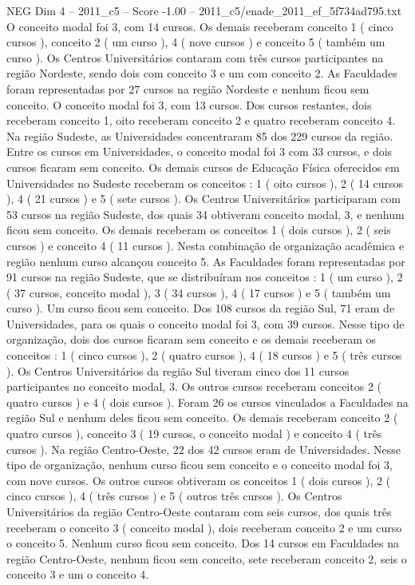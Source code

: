 \begin{textsample}{NEG Dim 4 – 2011\_c5 – Score -1.00 – 2011\_c5/enade\_2011\_ef\_5f734ad795.txt}
O conceito modal foi 3, com 14 cursos.
Os demais receberam conceito 1 ( cinco cursos ), conceito 2 ( um curso ), 4 ( nove cursos ) e conceito 5 ( também um curso ).
Os Centros Universitários contaram com três cursos participantes na região Nordeste, sendo dois com conceito 3 e um com conceito 2.
As Faculdades foram representadas por 27 cursos na região Nordeste e nenhum ficou sem conceito.
O conceito modal foi 3, com 13 cursos.
Dos cursos restantes, dois receberam conceito 1, oito receberam conceito 2 e quatro receberam conceito 4.
Na região Sudeste, as Universidades concentraram 85 dos 229 cursos da região.
Entre os cursos em Universidades, o conceito modal foi 3 com 33 cursos, e dois cursos ficaram sem conceito.
Os demais cursos de Educação Física oferecidos em Universidades no Sudeste receberam os conceitos : 1 ( oito cursos ), 2 ( 14 cursos ), 4 ( 21 cursos ) e 5 ( sete cursos ).
Os Centros Universitários participaram com 53 cursos na região Sudeste, dos quais 34 obtiveram conceito modal, 3, e nenhum ficou sem conceito.
Os demais receberam os conceitos 1 ( dois cursos ), 2 ( seis cursos ) e conceito 4 ( 11 cursos ).
Nesta combinação de organização acadêmica e região nenhum curso alcançou conceito 5.
As Faculdades foram representadas por 91 cursos na região Sudeste, que se distribuíram nos conceitos : 1 ( um curso ), 2 ( 37 cursos, conceito modal ), 3 ( 34 cursos ), 4 ( 17 cursos ) e 5 ( também um curso ).
Um curso ficou sem conceito.
Dos 108 cursos da região Sul, 71 eram de Universidades, para os quais o conceito modal foi 3, com 39 cursos.
Nesse tipo de organização, dois dos cursos ficaram sem conceito e os demais receberam os conceitos : 1 ( cinco cursos ), 2 ( quatro cursos ), 4 ( 18 cursos ) e 5 ( três cursos ).
Os Centros Universitários da região Sul tiveram cinco dos 11 cursos participantes no conceito modal, 3.
Os outros cursos receberam conceitos 2 ( quatro cursos ) e 4 ( dois cursos ).
Foram 26 os cursos vinculados a Faculdades na região Sul e nenhum deles ficou sem conceito.
Os demais receberam conceito 2 ( quatro cursos ), conceito 3 ( 19 cursos, o conceito modal ) e conceito 4 ( três cursos ).
Na região Centro-Oeste, 22 dos 42 cursos eram de Universidades.
Nesse tipo de organização, nenhum curso ficou sem conceito e o conceito modal foi 3, com nove cursos.
Os outros cursos obtiveram os conceitos 1 ( dois cursos ), 2 ( cinco cursos ), 4 ( três cursos ) e 5 ( outros três cursos ).
Os Centros Universitários da região Centro-Oeste contaram com seis cursos, dos quais três receberam o conceito 3 ( conceito modal ), dois receberam conceito 2 e um curso o conceito 5.
Nenhum curso ficou sem conceito.
Dos 14 cursos em Faculdades na região Centro-Oeste, nenhum ficou sem conceito, sete receberam conceito 2, seis o conceito 3 e um o conceito 4.

\end{textsample}
